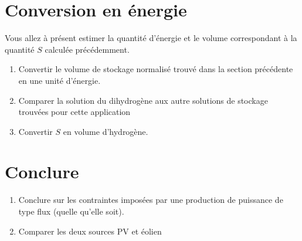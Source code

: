 \documentclass[12pt,a4]{article}
\begin{document}
\section{Conversion en énergie}

Vous allez à présent estimer la quantité d'énergie et le volume correspondant à la quantité $S$ calculée précédemment. 

\begin{enumerate}
	\item Convertir le volume de stockage normalisé trouvé dans la section précédente en une unité d'énergie.
	\item Comparer la solution du dihydrogène aux autre solutions de stockage trouvées pour cette application
	\item Convertir $S$ en volume d'hydrogène. 
\end{enumerate}


\section{Conclure}
\begin{enumerate}
	\item Conclure sur les contraintes imposées par une production de puissance de type flux (quelle qu'elle soit). 
	
	\item Comparer les deux  sources PV et éolien
\end{enumerate}
\end{document}
